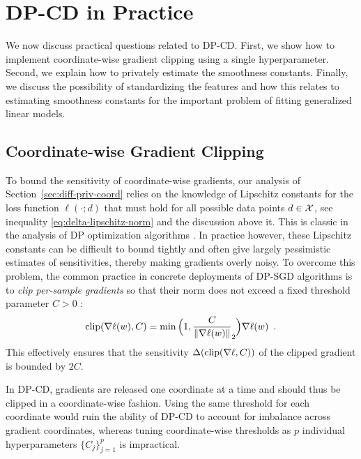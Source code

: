 

\section{DP-CD in Practice}
\label{sec:dp-cd-practice}

We now discuss practical questions related to DP-CD. First, we show how
to implement coordinate-wise gradient clipping using a single hyperparameter.
Second, we explain how to privately estimate the smoothness constants.
Finally, we
discuss the possibility of standardizing the features and how this relates
to estimating smoothness constants for the important problem of fitting
generalized linear models.


\subsection{Coordinate-wise Gradient Clipping}
\label{sub:clipping}

To bound the sensitivity of coordinate-wise gradients, our analysis of
Section~\ref{sec:diff-priv-coord} relies on the knowledge of Lipschitz
constants for the loss function $\ell(\cdot;d)$ that must hold for all
possible data points
$d\in \mathcal X$, see
inequality \eqref{eq:delta-lipschitz-norm} and the discussion above
it.
This is classic in the analysis of DP optimization algorithms \citep[see
  e.g.,][]
{bassily2014Private,wang2017Differentially}. In practice however, these
Lipschitz constants can be difficult to bound tightly and often
give largely pessimistic estimates of sensitivities, thereby making gradients
overly noisy. To overcome this problem, the common practice in concrete
deployments of DP-SGD algorithms is to \emph{clip per-sample gradients}
so that their norm does not exceed a fixed threshold parameter $C > 0$
\citep{abadi2016Deep}:
\begin{align}
  \label{eq:standard_clipping_rule}
  \operatorname{clip}(\nabla \ell(w), C)
  = \min\Big(1, \frac{C}{\left \lVert \nabla \ell(w) \right \rVert}_2\Big)  \nabla \ell(w)\enspace.
\end{align}
This effectively ensures that the sensitivity $\Delta(\operatorname{clip}(\nabla \ell, C))$
of the clipped gradient is bounded by $2C$.

In DP-CD, gradients are released one coordinate at a time and should
thus be clipped in a coordinate-wise fashion. Using the same threshold for
each coordinate would ruin the ability of DP-CD to account for imbalance
across gradient coordinates, whereas tuning coordinate-wise thresholds as $p$
individual
hyperparameters $\{C_j\}_{j=1}^p$
is impractical.

